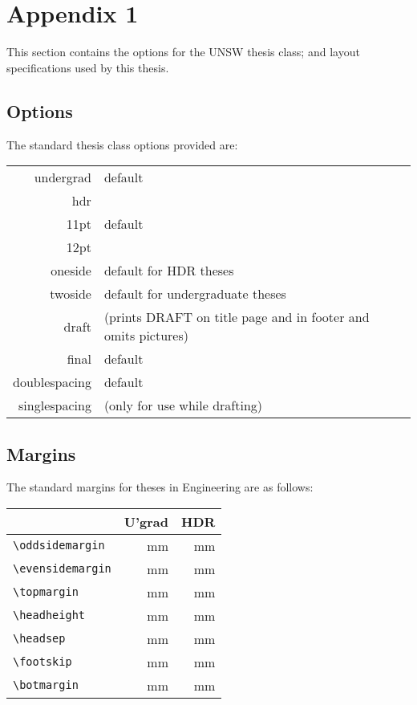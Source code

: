 \chapter{Appendix 1}\label{appendix}

This section contains the options for the UNSW thesis class; and
layout specifications used by this thesis.

\section{Options}

The standard thesis class options provided are:

\qquad
\begin{tabular}{rl}
undergrad & default \\
hdr & \\[2ex]
11pt & default\\
12pt &\\[2ex]
oneside & default for HDR theses\\
twoside & default for undergraduate theses\\[2ex]
draft & (prints DRAFT on title page and in footer and omits pictures)\\
final & default\\[2ex]
doublespacing & default\\
singlespacing & (only for use while drafting)
\end{tabular}

\section{Margins}

The standard margins for theses in Engineering are as follows:

\qquad
\begin{tabular}{|l|r|r|}
\hline
 & U'grad & HDR\\\hline
{\verb+\oddsidemargin+} & \unit[40]{mm} & \unit[40]{mm}\\
{\verb+\evensidemargin+} & \unit[25]{mm} & \unit[20]{mm}\\
{\verb+\topmargin+} & \unit[25]{mm} & \unit[30]{mm}\\
{\verb+\headheight+} & \unit[40]{mm} & \unit[40]{mm}\\
{\verb+\headsep+} & \unit[40]{mm} & \unit[40]{mm}\\
{\verb+\footskip+} & \unit[15]{mm} & \unit[15]{mm}\\
{\verb+\botmargin+} & \unit[20]{mm} & \unit[20]{mm}\\
\hline
\end{tabular}

